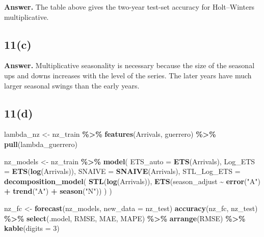 \documentclass[
  11pt,
]{article}
\newenvironment{Shaded}{\begin{snugshade}}{\end{snugshade}}
\newcommand{\AttributeTok}[1]{\textcolor[rgb]{0.13,0.29,0.53}{#1}}
\newcommand{\DecValTok}[1]{\textcolor[rgb]{0.00,0.00,0.81}{#1}}
\newcommand{\FunctionTok}[1]{\textcolor[rgb]{0.13,0.29,0.53}{\textbf{#1}}}
\newcommand{\NormalTok}[1]{#1}
\newcommand{\OtherTok}[1]{\textcolor[rgb]{0.56,0.35,0.01}{#1}}
\newcommand{\SpecialCharTok}[1]{\textcolor[rgb]{0.81,0.36,0.00}{\textbf{#1}}}
\newcommand{\StringTok}[1]{\textcolor[rgb]{0.31,0.60,0.02}{#1}}
\begin{document}
\textbf{Answer.} The table above gives the two-year test-set accuracy
for Holt--Winters multiplicative.

\subsection{11(c)}\label{c-2}

\textbf{Answer.} Multiplicative seasonality is necessary because the
size of the seasonal ups and downs increases with the level of the
series. The later years have much larger seasonal swings than the early
years.

\subsection{11(d)}\label{d-2}

\begin{Shaded}
\begin{Highlighting}[]
\NormalTok{lambda\_nz }\OtherTok{\textless{}{-}}\NormalTok{ nz\_train }\SpecialCharTok{\%\textgreater{}\%} \FunctionTok{features}\NormalTok{(Arrivals, guerrero) }\SpecialCharTok{\%\textgreater{}\%} \FunctionTok{pull}\NormalTok{(lambda\_guerrero)}

\NormalTok{nz\_models }\OtherTok{\textless{}{-}}\NormalTok{ nz\_train }\SpecialCharTok{\%\textgreater{}\%}
  \FunctionTok{model}\NormalTok{(}
    \AttributeTok{ETS\_auto =} \FunctionTok{ETS}\NormalTok{(Arrivals),}
    \AttributeTok{Log\_ETS =} \FunctionTok{ETS}\NormalTok{(}\FunctionTok{log}\NormalTok{(Arrivals)),}
    \AttributeTok{SNAIVE =} \FunctionTok{SNAIVE}\NormalTok{(Arrivals),}
    \AttributeTok{STL\_Log\_ETS =} \FunctionTok{decomposition\_model}\NormalTok{(}
      \FunctionTok{STL}\NormalTok{(}\FunctionTok{log}\NormalTok{(Arrivals)),}
      \FunctionTok{ETS}\NormalTok{(season\_adjust }\SpecialCharTok{\textasciitilde{}} \FunctionTok{error}\NormalTok{(}\StringTok{"A"}\NormalTok{) }\SpecialCharTok{+} \FunctionTok{trend}\NormalTok{(}\StringTok{"A"}\NormalTok{) }\SpecialCharTok{+} \FunctionTok{season}\NormalTok{(}\StringTok{"N"}\NormalTok{))}
\NormalTok{    )}
\NormalTok{  )}

\NormalTok{nz\_fc }\OtherTok{\textless{}{-}} \FunctionTok{forecast}\NormalTok{(nz\_models, }\AttributeTok{new\_data =}\NormalTok{ nz\_test)}
\FunctionTok{accuracy}\NormalTok{(nz\_fc, nz\_test) }\SpecialCharTok{\%\textgreater{}\%} \FunctionTok{select}\NormalTok{(.model, RMSE, MAE, MAPE) }\SpecialCharTok{\%\textgreater{}\%} \FunctionTok{arrange}\NormalTok{(RMSE) }\SpecialCharTok{\%\textgreater{}\%} \FunctionTok{kable}\NormalTok{(}\AttributeTok{digits =} \DecValTok{3}\NormalTok{)}
\end{Highlighting}
\end{Shaded}
\end{document}
